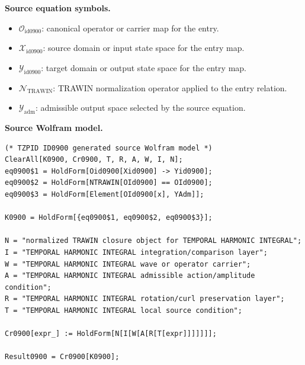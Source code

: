 \begin{minipage}[t]{0.49\linewidth}
\begingroup
\small
\raggedright
\textbf{Source equation symbols.}\par
\begin{itemize}[leftmargin=1.35em,itemsep=1pt,topsep=1pt,parsep=0pt]
    \item $\mathcal{O}_{\mathrm{id0900}}$: canonical operator or carrier map for the entry.
    \item $\mathcal{X}_{\mathrm{id0900}}$: source domain or input state space for the entry map.
    \item $\mathcal{Y}_{\mathrm{id0900}}$: target domain or output state space for the entry map.
    \item $\mathcal{N}_{\mathrm{TRAWIN}}$: TRAWIN normalization operator applied to the entry relation.
    \item $\mathcal{Y}_{\mathrm{adm}}$: admissible output space selected by the source equation.
\end{itemize}
\endgroup
\end{minipage}\hfill
\begin{minipage}[t]{0.47\linewidth}
\begingroup
\scriptsize
\raggedright
\textbf{Source Wolfram model.}\par
\begin{Verbatim}[fontsize=\tiny,breaklines=true,breakanywhere=true]
(* TZPID ID0900 generated source Wolfram model *)
ClearAll[K0900, Cr0900, T, R, A, W, I, N];
eq0900$1 = HoldForm[Oid0900[Xid0900] -> Yid0900];
eq0900$2 = HoldForm[NTRAWIN[OId0900] == OId0900];
eq0900$3 = HoldForm[Element[OId0900[x], YAdm]];

K0900 = HoldForm[{eq0900$1, eq0900$2, eq0900$3}];

N = "normalized TRAWIN closure object for TEMPORAL HARMONIC INTEGRAL";
I = "TEMPORAL HARMONIC INTEGRAL integration/comparison layer";
W = "TEMPORAL HARMONIC INTEGRAL wave or operator carrier";
A = "TEMPORAL HARMONIC INTEGRAL admissible action/amplitude condition";
R = "TEMPORAL HARMONIC INTEGRAL rotation/curl preservation layer";
T = "TEMPORAL HARMONIC INTEGRAL local source condition";

Cr0900[expr_] := HoldForm[N[I[W[A[R[T[expr]]]]]]];

Result0900 = Cr0900[K0900];
\end{Verbatim}
\endgroup
\end{minipage}

